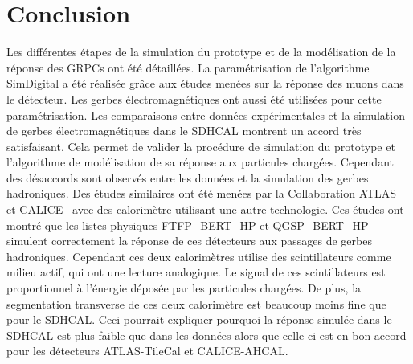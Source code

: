 \section{Conclusion}
Les différentes étapes de la simulation du prototype et de la modélisation de la réponse des GRPCs ont été détaillées. La paramétrisation de l'algorithme SimDigital a été réalisée grâce aux études menées sur la réponse des muons dans le détecteur. Les gerbes électromagnétiques ont aussi été utilisées pour cette paramétrisation. Les comparaisons entre données expérimentales et la simulation de gerbes électromagnétiques dans le SDHCAL montrent un accord très satisfaisant. Cela permet de valider la procédure de simulation du prototype et l'algorithme de modélisation de sa réponse aux particules chargées. Cependant des désaccords sont observés entre les données et la simulation des gerbes hadroniques. Des études similaires ont été menées par la Collaboration ATLAS~\cite{Abat} et CALICE~\cite{geant4-ahcal} avec des calorimètre utilisant une autre technologie. Ces études ont montré que les listes physiques FTFP\_BERT\_HP et QGSP\_BERT\_HP simulent correctement la réponse de ces détecteurs aux passages de gerbes hadroniques. Cependant ces deux calorimètres utilise des scintillateurs comme milieu actif, qui ont une lecture analogique. Le signal de ces scintillateurs est proportionnel à l'énergie déposée par les particules chargées. De plus, la segmentation transverse de ces deux calorimètre est beaucoup moins fine que pour le SDHCAL. Ceci pourrait expliquer pourquoi la réponse simulée dans le SDHCAL est plus faible que dans les données alors que celle-ci est en bon accord pour les détecteurs ATLAS-TileCal et CALICE-AHCAL.
